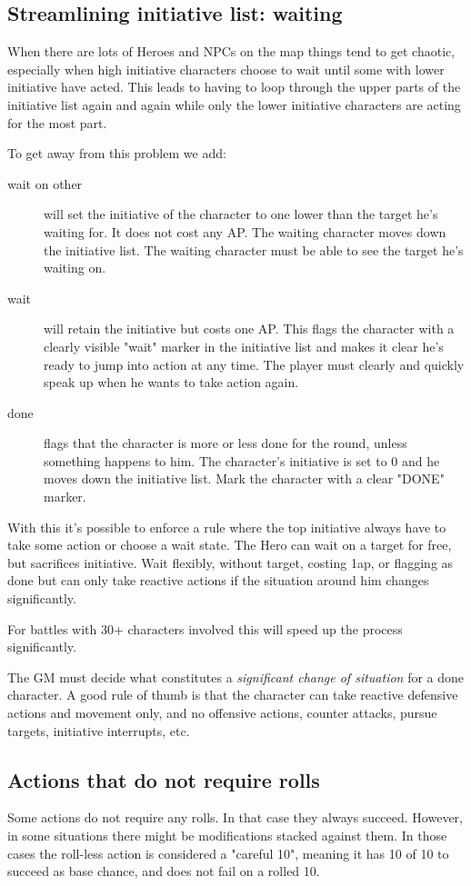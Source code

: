 \subsection*{Streamlining initiative list: waiting}
When there are lots of Heroes and NPCs on the map things tend to get chaotic, especially when high initiative characters choose to wait until some with lower initiative have acted. This leads to having to loop through the upper parts of the initiative list again and again while only the lower initiative characters are acting for the most part.

To get away from this problem we add:
\begin{description}
\item[wait on other] will set the initiative of the character to one lower than the target he's waiting for. It does not cost any AP. The waiting character moves down the initiative list. The waiting character must be able to see the target he's waiting on.
\item[wait] will retain the initiative but costs one AP. This flags the character with a clearly visible "wait" marker in the initiative list and makes it clear he's ready to jump into action at any time. The player must clearly and quickly speak up when he wants to take action again.
\item[done] flags that the character is more or less done for the round, unless something happens to him. The character's initiative is set to 0 and he moves down the initiative list. Mark the character with a clear "DONE" marker.
\end{description}

With this it's possible to enforce a rule where the top initiative always have to take some action or choose a wait state. The Hero can wait on a target for free, but sacrifices initiative. Wait flexibly, without target, costing 1ap, or flagging as done but can only take reactive actions if the situation around him changes significantly.

For battles with 30+ characters involved this will speed up the process significantly.

The GM must decide what constitutes a \emph{significant change of situation} for a done character. A good rule of thumb is that the character can take reactive defensive actions and movement only, and no offensive actions, counter attacks, pursue targets, initiative interrupts, etc.


\subsection*{Actions that do not require rolls}
Some actions do not require any rolls. In that case they always succeed. However, in some situations there might be modifications stacked against them. In those cases the roll-less action is considered a "careful 10", meaning it has 10 of 10 to succeed as base chance, and does not fail on a rolled 10.

